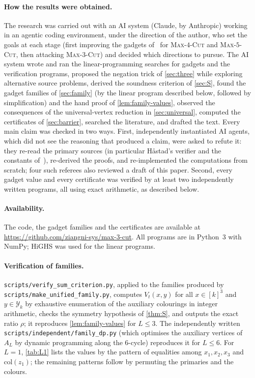 \documentclass[11pt,letterpaper]{article}
\theoremstyle{remark}
\newcommand{\MC}[1]{\textup{\textsc{Max-$#1$-Cut}}}
\newcommand{\Y}{\mathcal{Y}}
\newcommand{\col}{\mathrm{col}}
\begin{document}
\paragraph{How the results were obtained.}
The research was carried out with an AI system (Claude, by Anthropic) working in an agentic coding
environment, under the direction of the author, who set the goals at each stage (first improving the
gadgets of~\cite{NRT25} for \MC{4} and \MC{5}, then attacking \MC{3}) and decided which directions to
pursue. The AI system wrote and ran the linear-programming searches for gadgets and the verification
programs, proposed the negation trick of \cref{sec:three} while exploring alternative source problems,
derived the soundness criterion of \cref{sec:S}, found the gadget families of \cref{sec:family} (by the
linear program described below, followed by simplification) and the hand proof of
\cref{lem:family-values}, observed the consequences of the universal-vertex reduction in
\cref{sec:universal}, computed the certificates of \cref{sec:barrier}, searched the literature, and drafted
the text. Every main claim was checked in two ways. First, independently instantiated AI agents, which did
not see the reasoning that produced a claim, were asked to refute it: they re-read the primary sources
(in particular H\aa stad's verifier and the constants of~\cite{GS13,AOTW14}), re-derived the proofs, and
re-implemented the computations from scratch; four such referees also reviewed a draft of this paper.
Second, every gadget value and every certificate was verified by at least two independently written
programs, all using exact arithmetic, as described below.

\paragraph{Availability.}
The code, the gadget families and the certificates are available at
\url{https://github.com/ziangni-sys/max-3-cut}. All programs are in Python~3 with NumPy; HiGHS was used for the linear
programs.

\paragraph{Verification of families.} \texttt{scripts/verify\_sum\_criterion.py}, applied to the families
produced by \texttt{scripts/make\_unified\_family.py}, computes $V_t(x,y)$ for all $x\in[k]^3$ and
$y\in\Y_k$ by exhaustive enumeration of the auxiliary colourings in integer arithmetic, checks the
symmetry hypothesis of \cref{thm:S}, and outputs the exact ratio $\rho$; it reproduces
\cref{lem:family-values} for $L\le3$. The independently written \texttt{scripts/independent/family\_dp.py}
(which optimises the auxiliary vertices of $A_L$ by dynamic programming along the $6$-cycle) reproduces it
for $L\le6$. For $L=1$, \cref{tab:L1} lists the values by the pattern of equalities among
$x_1,x_2,x_3$ and $\col(z_1)$; the remaining patterns follow by permuting the primaries and the colours.
\end{document}

